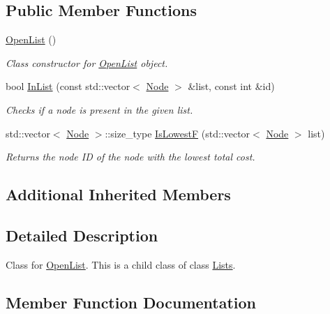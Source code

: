 \subsection*{Public Member Functions}
\begin{DoxyCompactItemize}
\item 
\hyperlink{classOpenList_a31b619dcd6456acdfec2b38eb1c8337d}{Open\+List} ()\hypertarget{classOpenList_a31b619dcd6456acdfec2b38eb1c8337d}{}\label{classOpenList_a31b619dcd6456acdfec2b38eb1c8337d}

\begin{DoxyCompactList}\small\item\em Class constructor for \hyperlink{classOpenList}{Open\+List} object. \end{DoxyCompactList}\item 
bool \hyperlink{classOpenList_ac5f9e1949bc4732fdfe7d84f6a7efcf1}{In\+List} (const std\+::vector$<$ \hyperlink{classNode}{Node} $>$ \&list, const int \&id)
\begin{DoxyCompactList}\small\item\em Checks if a node is present in the given list. \end{DoxyCompactList}\item 
std\+::vector$<$ \hyperlink{classNode}{Node} $>$\+::size\+\_\+type \hyperlink{classOpenList_a09ff2042663d5c504562c5fabfba7a61}{Is\+LowestF} (std\+::vector$<$ \hyperlink{classNode}{Node} $>$ list)
\begin{DoxyCompactList}\small\item\em Returns the node ID of the node with the lowest total cost. \end{DoxyCompactList}\end{DoxyCompactItemize}
\subsection*{Additional Inherited Members}


\subsection{Detailed Description}
Class for \hyperlink{classOpenList}{Open\+List}. This is a child class of class \hyperlink{classLists}{Lists}. 

\subsection{Member Function Documentation}
